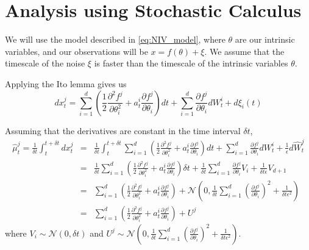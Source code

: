 \documentclass[12pt]{article}
\begin{document}
\section{Analysis using Stochastic Calculus}

We will use the model described in \eqref{eq:NIV_model}, where $\theta$ are our intrinsic variables, and our observations will be $x = f(\theta) + \xi$.  
%
We assume that the timescale of the noise $\xi$ is faster than the timescale of the intrinsic variables $\theta$. 



Applying the Ito lemma gives us
\begin{equation}
dx_t^j =  \sum_{i=1}^d \left( \frac{1}{2}  \frac{\partial ^2 f^j}{\partial \theta_i^2} + a_t^i \frac{\partial f^j}{\partial \theta_i} \right) dt + \sum_{i=1}^{d} \frac{\partial f^j}{\partial \theta_i} dW_t^i + d \xi_i(t)
\end{equation}

Assuming that the derivatives are constant in the time interval $\delta t$,
\begin{eqnarray}
\hat{\mu}_t^j = \frac{1}{\delta t} \int_{t}^{t + \delta t} dx_t^j &=& 
\frac{1}{\delta t} \int_{t}^{t + \delta t} \sum_{i=1}^d \left( \frac{1}{2}  \frac{\partial ^2 f^j}{\partial \theta_i^2} + a_t^i \frac{\partial f^j}{\partial \theta_i} \right) dt + \sum_{i=1}^{d} \frac{\partial f^j}{\partial \theta_i} dW_t^i + \frac{1}{\epsilon} d \hat{W}^j_t \\
&=& \frac{1}{\delta t} \sum_{i=1}^d \left( \frac{1}{2}  \frac{\partial ^2 f^j}{\partial \theta_i^2} + a_t^i \frac{\partial f^j}{\partial \theta_i} \right) \delta t + \frac{1}{\delta t} \sum_{i=1}^{d} \frac{\partial f^j}{\partial \theta_i} V_i + \frac{1}{\delta t \epsilon} V_{d+1}\\ 
&=& \sum_{i=1}^d \left( \frac{1}{2}  \frac{\partial ^2 f^j}{\partial \theta_i^2} + a_t^i \frac{\partial f^j}{\partial \theta_i} \right) + \mathcal{N}\left( 0, \frac{1}{\delta t} \sum_{i=1}^d \left( \frac{\partial f^j}{\partial \theta_i} \right)^2 + \frac{1}{\delta t \epsilon^2} \right)\\
&=& \sum_{i=1}^d \left( \frac{1}{2}  \frac{\partial ^2 f^j}{\partial \theta_i^2} + a_t^i \frac{\partial f^j}{\partial \theta_i} \right) + U^j
\end{eqnarray}
where $V_i \sim \mathcal{N}(0, \delta t)$ and $U^j \sim \mathcal{N}\left( 0, \frac{1}{\delta t} \sum_{i=1}^d \left( \frac{\partial f^j}{\partial \theta_i} \right)^2 + \frac{1}{\delta t \epsilon^2} \right)$.
\end{document}
